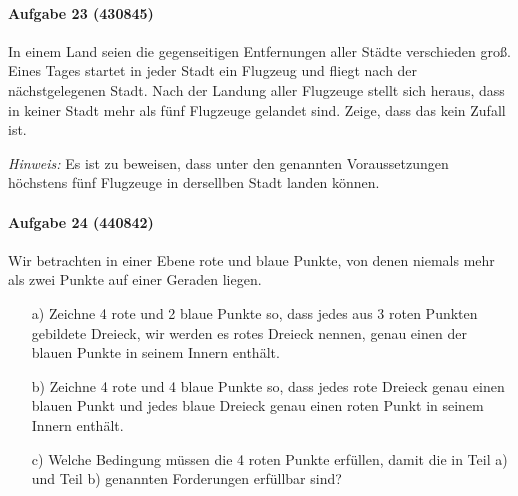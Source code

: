 \documentclass[11pt,a4paper]{article}
\begin{document}
\paragraph{Aufgabe 23 (430845)} 
In einem Land seien die gegenseitigen Entfernungen aller Städte verschieden
groß. Eines Tages startet in jeder Stadt ein Flugzeug und fliegt nach der
nächstgelegenen Stadt. Nach der Landung aller Flugzeuge stellt sich heraus,
dass in keiner Stadt mehr als fünf Flugzeuge gelandet sind. Zeige, dass das
kein Zufall ist.

\emph{Hinweis:} Es ist zu beweisen, dass unter den genannten Voraussetzungen
höchstens fünf Flugzeuge in dersellben Stadt landen können.

\paragraph{Aufgabe 24 (440842)} 
Wir betrachten in einer Ebene rote und blaue Punkte, von denen niemals mehr
als zwei Punkte auf einer Geraden liegen.
\begin{itemize}
\item[a)] Zeichne 4 rote und 2 blaue Punkte so, dass jedes aus 3 roten Punkten
  gebildete Dreieck, wir werden es rotes Dreieck nennen, genau einen der
  blauen Punkte in seinem Innern enthält.
\item[b)] Zeichne 4 rote und 4 blaue Punkte so, dass jedes rote Dreieck genau
  einen blauen Punkt und jedes blaue Dreieck genau einen roten Punkt in seinem
  Innern enthält.
\item[c)] Welche Bedingung müssen die 4 roten Punkte erfüllen, damit die in
  Teil a) und Teil b) genannten Forderungen erfüllbar sind?
\end{itemize}
\end{document}
